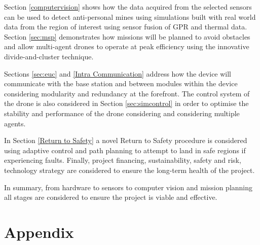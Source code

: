 \documentclass{report_template_oxford}
\begin{document}
Section \ref{computervision} shows how the data acquired from the selected sensors can be used to detect anti-personal mines using simulations built with real world data from the region of interest using sensor fusion of \gls{GPR} and thermal data. Section \ref{sec:msp} demonstrates how missions will be planned to avoid obstacles and allow multi-agent drones to operate at peak efficiency using the innovative divide-and-cluster technique. 

Sections \ref{sec:euc} and \ref{Intra Communication} address how the device will communicate with the base station and between modules within the device considering modularity and redundancy at the forefront. The control system of the drone is also considered in Section \ref{sec:simcontrol} in order to optimise the stability and performance of the drone considering and considering multiple agents. 

In Section \ref{Return to Safety} a novel Return to Safety procedure is considered using adaptive control and path planning to attempt to land in safe regions if experiencing faults. Finally, project financing, sustainability, safety and risk, technology strategy are considered to ensure the long-term health of the project. 

In summary, from hardware to sensors to computer vision and mission planning all stages are considered to ensure the project is viable and effective.
\newpage
{}

\newpage
{}
\section*{Appendix}
\end{document}
